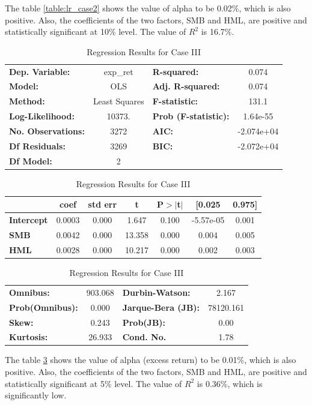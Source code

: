  
The table \ref{table:lr_case2} shows the value of alpha to be 0.02\%, which is also positive. Also, the coefficients of the two factors, SMB and HML, are positive and statistically significant at 10\% level. The value of $R^2$ is 16.7\%.


\begin{table}
\centering
\begin{tabular}{|lc|lc|}
\hline
\textbf{Dep. Variable:}    &     exp\_ret      & \textbf{  R-squared:         } &     0.074   \\
\textbf{Model:}            &       OLS        & \textbf{  Adj. R-squared:    } &     0.074   \\
\textbf{Method:}           &  Least Squares   & \textbf{  F-statistic:       } &     131.1   \\
\textbf{Log-Likelihood:} &    10373. & \textbf{  Prob (F-statistic):} &  1.64e-55   \\
\textbf{No. Observations:} &        3272      & \textbf{  AIC:               } & -2.074e+04  \\
\textbf{Df Residuals:}     &        3269      & \textbf{  BIC:               } & -2.072e+04  \\
\textbf{Df Model:}         &           2      & \textbf{                     } &             \\
\hline
\end{tabular}

\bigskip

\begin{tabular}{|l|cccccc|}
\hline
                   & \textbf{coef} & \textbf{std err} & \textbf{t} & \textbf{P$>$$|$t$|$} & \textbf{[0.025} & \textbf{0.975]}  \\
\hline
\textbf{Intercept} &       0.0003  &        0.000     &     1.647  &         0.100        &    -5.57e-05    &        0.001     \\
\textbf{SMB}       &       0.0042  &        0.000     &    13.358  &         0.000        &        0.004    &        0.005     \\
\textbf{HML}       &       0.0028  &        0.000     &    10.217  &         0.000        &        0.002    &        0.003     \\
\hline
\end{tabular}

\bigskip

\begin{tabular}{|lc|lc|}
\textbf{Omnibus:}       & 903.068 & \textbf{  Durbin-Watson:     } &     2.167  \\
\textbf{Prob(Omnibus):} &   0.000 & \textbf{  Jarque-Bera (JB):  } & 78120.161  \\
\textbf{Skew:}          &   0.243 & \textbf{  Prob(JB):          } &      0.00  \\
\textbf{Kurtosis:}      &  26.933 & \textbf{  Cond. No.          } &      1.78  \\
\hline
\end{tabular}
\caption{Regression Results for Case III}
\label{table:lr_case3}
\end{table}

The table \ref{table:lr_case3} shows the value of alpha (excess return) to be 0.01\%, which is also positive. Also, the coefficients of the two factors, SMB and HML, are positive and statistically significant at 5\% level. The value of $R^2$ is 0.36\%, which is significantly low.